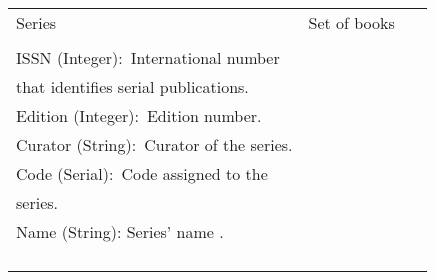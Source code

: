 \begin{longtable}{l|l|l}
\hline
Series   & \textcolor[rgb]{0.125,0.129,0.141}{Set of books~}                                                                                                          & \begin{tabular}[c]{@{}l@{}}\\\\ISSN (Integer):~\textcolor[rgb]{0.125,0.129,0.141}{International number}\\\textcolor[rgb]{0.125,0.129,0.141}{that identifies serial publications.}\\Edition (Integer):~\textcolor[rgb]{0.125,0.129,0.141}{Edition number.}\\Curator (String):~\textcolor[rgb]{0.125,0.129,0.141}{Curator of the series}.\\Code (Serial):~\textcolor[rgb]{0.125,0.129,0.141}{Code assigned to the }\\\textcolor[rgb]{0.125,0.129,0.141}{series.}\\Name (String): Series' name .\\\\\\\\\end{tabular}                                                                                                                                                                                                                                                                                                                                                                                                                                                                                                                                                                                                                                                                                                                                                                                                             \\ 
\hline

\end{longtable}
